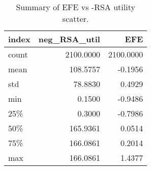 \begin{table}[!ht]
\centering
\begin{table}
\caption{Summary of EFE vs -RSA utility scatter.}
\label{tab:fig11}
\begin{tabular}{lrr}
\toprule
index & neg\_RSA\_util & EFE \\
\midrule
count & 2100.0000 & 2100.0000 \\
mean & 108.5757 & -0.1956 \\
std & 78.8830 & 0.4929 \\
min & 0.1500 & -0.9486 \\
25\% & 0.3000 & -0.7986 \\
50\% & 165.9361 & 0.0514 \\
75\% & 166.0861 & 0.2014 \\
max & 166.0861 & 1.4377 \\
\bottomrule
\end{tabular}
\end{table}
\end{table}
